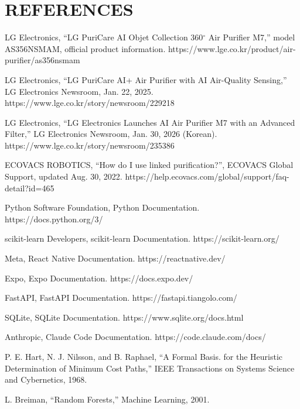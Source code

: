 \documentclass[conference]{IEEEtran}
\begin{document}
\section*{REFERENCES}
\par\noindent [1] LG Electronics, “LG PuriCare AI Objet Collection 360$^\circ$ Air Purifier M7,” model AS356NSMAM, official product information. https://www.lge.co.kr/product/air-purifier/as356nsmam
\par\noindent [2] LG Electronics, “LG PuriCare AI+ Air Purifier with AI Air-Quality Sensing,” LG Electronics Newsroom, Jan. 22, 2025. https://www.lge.co.kr/story/newsroom/229218
\par\noindent [3] LG Electronics, “LG Electronics Launches AI Air Purifier M7 with an Advanced Filter,” LG Electronics Newsroom, Jan. 30, 2026 (Korean). https://www.lge.co.kr/story/newsroom/235386
\par\noindent [4] ECOVACS ROBOTICS, “How do I use linked purification?”, ECOVACS Global Support, updated Aug. 30, 2022. https://help.ecovacs.com/global/support/faq-detail?id=465
\par\noindent [5] Python Software Foundation, Python Documentation.
https://docs.python.org/3/

\par\noindent [6] scikit-learn Developers, scikit-learn Documentation. https://scikit-learn.org/
\par\noindent [7] Meta, React Native Documentation. https://reactnative.dev/
\par\noindent [8] Expo, Expo Documentation. https://docs.expo.dev/
\par\noindent [9] FastAPI, FastAPI Documentation.
https://fastapi.tiangolo.com/

\par\noindent [10] SQLite, SQLite Documentation.
https://www.sqlite.org/docs.html

\par\noindent [11] Anthropic, Claude Code Documentation.
https://code.claude.com/docs/

\par\noindent [12] P. E. Hart, N. J. Nilsson, and B. Raphael, “A Formal Basis. for the Heuristic Determination of Minimum Cost Paths,” IEEE Transactions on Systems Science and Cybernetics, 1968.
\par\noindent [13] L. Breiman, “Random Forests,” Machine Learning, 2001.
\end{document}

